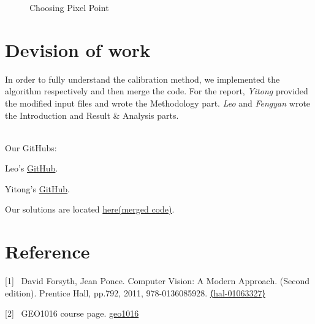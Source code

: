 \documentclass[a4paper]{article}
\begin{document}
\begin{figure}[htbp]
\centering
{}
\caption{Choosing Pixel Point}
\end{figure}

\section{Devision of work}

In order to fully understand the calibration method, we implemented the algorithm respectively and then merge the code. For the report, \textit{Yitong} provided the modified input files and wrote the Methodology part. \textit{Leo} and \textit{Fengyan} wrote the Introduction and Result \& Analysis parts.

~\\
Our GitHubs:

Leo's \href{https://github.com/leowhk/A1_calibration}{GitHub}.

Yitong's \href{https://github.com/YitongXia/camera-calibration}{GitHub}.

Our solutions are located \href{https://github.com/SEUZFY/Camera_Calibration}{here(merged code)}.

\section{Reference}
[1] \  David Forsyth, Jean Ponce. Computer Vision: A Modern Approach. (Second edition). Prentice Hall, pp.792, 2011, 978-0136085928. \href{https://hal.inria.fr/hal-01063327}{⟨hal-01063327⟩}

[2] \  GEO1016 course page. \href{https://3d.bk.tudelft.nl/courses/geo1016/index.html}{geo1016}
\end{document}
